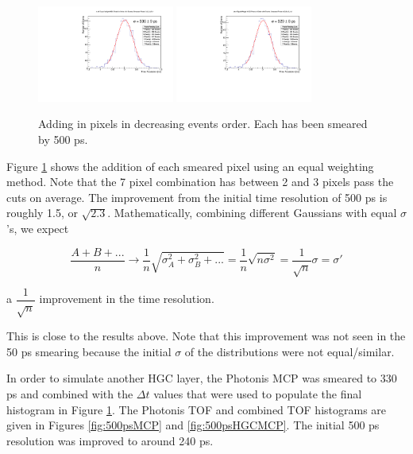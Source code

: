 \documentclass[12pt]{article}
\begin{document}
\begin{figure}[h]
	\includegraphics[width=0.4\textwidth]{SKIROC/SKIROC_6_Pixels500.pdf}
	\includegraphics[width=0.4\textwidth]{SKIROC/SKIROC_7_Pixels500.pdf}
	\caption{Adding in pixels in decreasing events order.
		Each has been smeared by 500 ps.}
	\label{fig:500psAll}
\end{figure}

Figure \ref{fig:500psAll} shows the addition of each smeared pixel using an equal weighting method. 
Note that the 7 pixel combination has between 2 and 3 pixels pass the cuts on average. 
The improvement from the initial time resolution of 500 ps is roughly 1.5, or $\sqrt{2.3}$.
Mathematically, combining different Gaussians with equal $\sigma$'s, we expect

\[
\dfrac{A+B+...}{n}
\rightarrow
\frac{1}{n}\sqrt{\sigma_A^2+\sigma_B^2+...} =
\frac{1}{n}\sqrt{n \sigma^2} =
\frac{1}{\sqrt{n}} \sigma = 
\sigma'
\]

\centerline{
a $\dfrac{1}{\sqrt{n}}$ improvement in the time resolution.
}

This is close to the results above. 
Note that this improvement was not seen in the 50 ps smearing because the initial $\sigma$ of the distributions were not equal/similar.

In order to simulate another HGC layer, the Photonis MCP was smeared to 330 ps and combined with the $\Delta t$ values that were used to populate the final histogram in Figure \ref{fig:500psAll}. 
The Photonis TOF and combined TOF histograms are given in Figures \ref{fig:500psMCP} and \ref{fig:500psHGCMCP}. 
The initial 500 ps resolution was improved to around 240 ps. 
\end{document}
